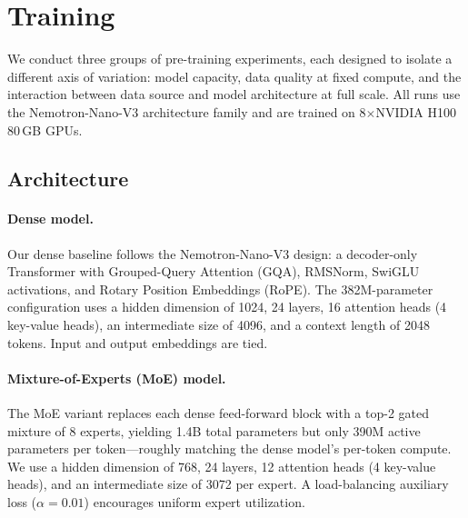 
\section{Training}
\label{sec:training}

We conduct three groups of pre-training experiments, each designed to isolate a
different axis of variation: model capacity, data quality at fixed compute, and
the interaction between data source and model architecture at full scale.
All runs use the Nemotron-Nano-V3 architecture family and are trained on
8$\times$NVIDIA H100 80\,GB GPUs.

\subsection{Architecture}
\label{sec:architecture}

\paragraph{Dense model.}
Our dense baseline follows the Nemotron-Nano-V3 design: a decoder-only
Transformer with Grouped-Query Attention (GQA), RMSNorm, SwiGLU activations,
and Rotary Position Embeddings (RoPE).  The 382M-parameter configuration uses
a hidden dimension of 1024, 24 layers, 16 attention heads (4 key-value heads),
an intermediate size of 4096, and a context length of 2048 tokens.  Input and
output embeddings are tied.

\paragraph{Mixture-of-Experts (MoE) model.}
The MoE variant replaces each dense feed-forward block with a top-2 gated
mixture of 8 experts, yielding 1.4B total parameters but only 390M active
parameters per token---roughly matching the dense model's per-token compute.
We use a hidden dimension of 768, 24 layers, 12 attention heads (4 key-value
heads), and an intermediate size of 3072 per expert.  A load-balancing
auxiliary loss ($\alpha=0.01$) encourages uniform expert utilization.

